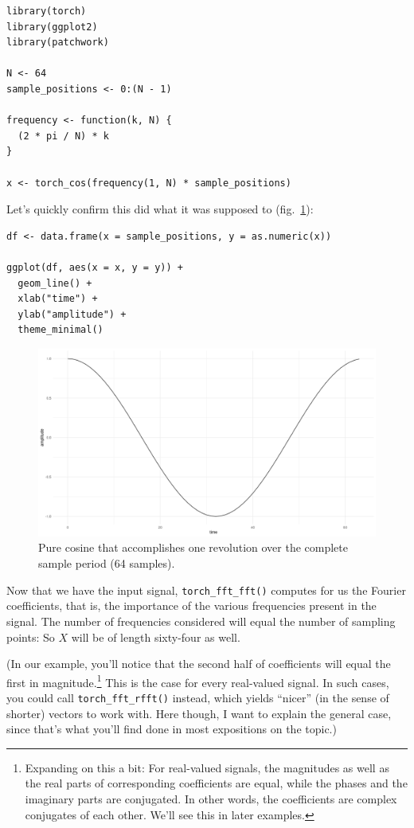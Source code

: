 \documentclass[
  letterpaper,
]{krantz}
\begin{document}
\begin{verbatim}
library(torch)
library(ggplot2)
library(patchwork)

N <- 64
sample_positions <- 0:(N - 1)

frequency <- function(k, N) {
  (2 * pi / N) * k
}

x <- torch_cos(frequency(1, N) * sample_positions)
\end{verbatim}

Let's quickly confirm this did what it was supposed to
(fig.~\ref{fig-dft-cos-1-rev}):

\begin{verbatim}
df <- data.frame(x = sample_positions, y = as.numeric(x))

ggplot(df, aes(x = x, y = y)) +
  geom_line() +
  xlab("time") +
  ylab("amplitude") +
  theme_minimal()
\end{verbatim}

\begin{figure}[H]

{\centering \includegraphics{images/dft-cos-1-rev.png}

}

\caption{\label{fig-dft-cos-1-rev}Pure cosine that accomplishes one
revolution over the complete sample period (64 samples).}

\end{figure}

Now that we have the input signal, \texttt{torch\_fft\_fft()} computes
for us the Fourier coefficients, that is, the importance of the various
frequencies present in the signal. The number of frequencies considered
will equal the number of sampling points: So \(X\) will be of length
sixty-four as well.

(In our example, you'll notice that the second half of coefficients will
equal the first in magnitude.\footnote{Expanding on this a bit: For
  real-valued signals, the magnitudes as well as the real parts of
  corresponding coefficients are equal, while the phases and the
  imaginary parts are conjugated. In other words, the coefficients are
  complex conjugates of each other. We'll see this in later examples.}
This is the case for every real-valued signal. In such cases, you could
call \texttt{torch\_fft\_rfft()} instead, which yields ``nicer'' (in the
sense of shorter) vectors to work with. Here though, I want to explain
the general case, since that's what you'll find done in most expositions
on the topic.)
\end{document}

